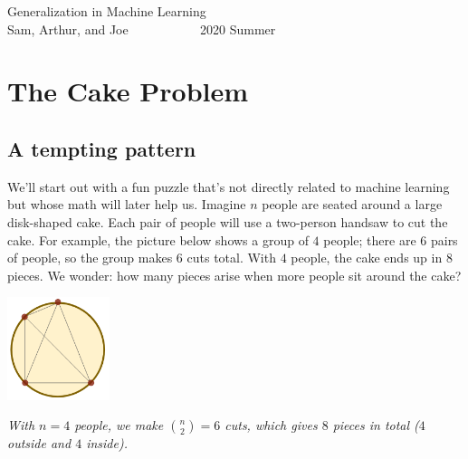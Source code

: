 \documentclass[openany, notitlepage, justified]{tufte-book}
\begin{document}
    \begin{adjustwidth}{0in}{-1.3in}
    \begin{center}
        \Huge 
        Generalization in Machine Learning \\
        \large         
        Sam, Arthur, and Joe ~~~~~~~~~~ 2020 Summer
    \end{center}
    \end{adjustwidth}

    \chapter{The Cake Problem}
        \section{A tempting pattern}
            We'll start out with a fun puzzle that's not directly related to
            machine learning but whose math will later help us.
            Imagine $n$ people are seated around a large disk-shaped cake.
            Each pair of people will use a two-person handsaw to cut the cake.
            For example, the picture below shows a group of $4$ people; there
            are $6$ pairs of people, so the group makes $6$ cuts total.  With
            $4$ people, the cake ends up in $8$ pieces.  We
            wonder: how many pieces arise when more people sit
            around the cake?
            \begin{marginfigure}
                \centering
                \includegraphics[height=3cm]{cake-4}
                \caption{\emph{
                    With $n=4$ people, we make ${n\choose 2}=6$ cuts, which gives
                    $8$ pieces in total ($4$ outside and $4$ inside).  
                }}
            \end{marginfigure}
\end{document}
